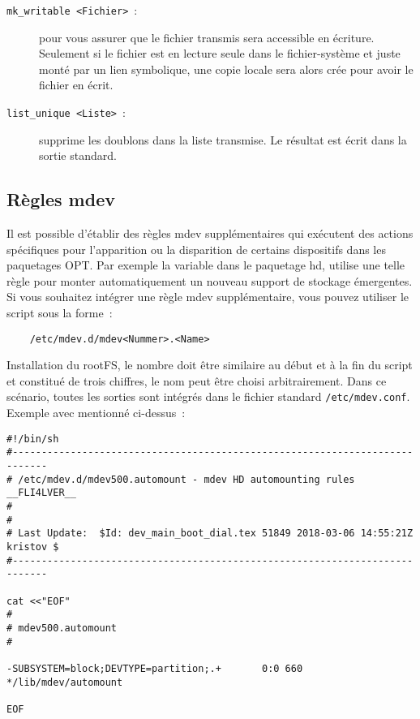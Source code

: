 \begin{description}

\item[\texttt{mk\_writable <Fichier>}~:] pour vous assurer que le fichier transmis
sera accessible en écriture. Seulement si le fichier est en lecture seule dans
le fichier-système et juste monté par un lien symbolique, une copie locale
sera alors crée pour avoir le fichier en écrit.

\item[\texttt{list\_unique <Liste>}~:] supprime les doublons dans la liste transmise.
Le résultat est écrit dans la sortie standard.

\end{description}

\subsection{Règles mdev}

Il est possible d'établir des règles mdev supplémentaires qui exécutent des
actions spécifiques pour l'apparition ou la disparition de certains dispositifs
dans les paquetages OPT. Par exemple la variable  dans le
paquetage hd, utilise une telle règle pour monter automatiquement un nouveau
support de stockage émergentes. Si vous souhaitez intégrer une règle mdev
supplémentaire, vous pouvez utiliser le script sous la forme~:

\begin{verbatim}
    /etc/mdev.d/mdev<Nummer>.<Name>
\end{verbatim}

Installation du rootFS, le nombre doit être similaire au début et à la fin du script
et constitué de trois chiffres, le nom peut être choisi arbitrairement. Dans ce
scénario, toutes les sorties sont intégrés dans le fichier standard
\texttt{/etc/mdev.conf}. Exemple avec  mentionné ci-dessus~:

\begin{small}
\begin{verbatim}
#!/bin/sh
#----------------------------------------------------------------------------
# /etc/mdev.d/mdev500.automount - mdev HD automounting rules     __FLI4LVER__
#
#
# Last Update:  $Id: dev_main_boot_dial.tex 51849 2018-03-06 14:55:21Z kristov $
#----------------------------------------------------------------------------

cat <<"EOF"
#
# mdev500.automount
#

-SUBSYSTEM=block;DEVTYPE=partition;.+       0:0 660 */lib/mdev/automount

EOF
\end{verbatim}
\end{small}

